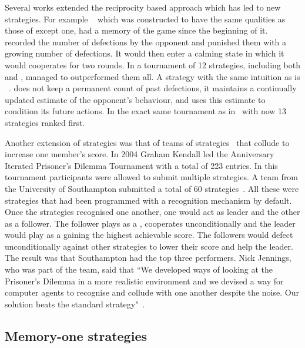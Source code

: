 Several works extended the reciprocity based approach which has led to new
strategies. For example \Gradual~\cite{Beaufils1997} which was constructed to
have the same qualities as those of \TitForTat except one,
\Gradual had a memory of the game since the beginning of it. \Gradual
recorded the number of defections by the opponent and punished them with a
growing number of defections. It would then enter a calming state in which it
would cooperates for two rounds. In a tournament of 12 strategies, including
both \TitForTat and \Pavlov, \Gradual managed to outperformed them all. A
strategy with the same intuition as \Gradual is \AdaptiveTitForTat~\cite{tzafestas-2000a}.
\AdaptiveTitForTat does not keep a permanent
count of past defections, it maintains a continually updated estimate of the
opponent’s behaviour, and uses this estimate to condition its future actions. In
the exact same tournament as in~\cite{Beaufils1997} with now 13 strategies
\AdaptiveTitForTat ranked first.

Another extension of strategies was that of teams of
strategies~\cite{J.P.Delahaye1993Lp, J.P.Delahaye1995LIeP, A.Rogers2007Ctpw}
that collude to increase one member's score. In 2004 Graham Kendall led the
Anniversary Iterated Prisoner's Dilemma Tournament with a total of 223 entries.
In this tournament participants were allowed to submit multiple strategies. A
team from the University of Southampton submitted a total of 60
strategies~\cite{A.Rogers2007Ctpw}. All these were strategies that had been
programmed with a recognition mechanism by default. Once the strategies
recognised one another, one would act as leader and the other as a follower. The
follower plays as a \Cooperator, cooperates unconditionally and the
leader would play as a \Defector gaining the highest achievable score.
The followers would defect unconditionally against other strategies to lower
their score and help the leader. The result was that Southampton had the top
three performers. Nick Jennings, who was part of the team, said that ``We
developed ways of looking at the Prisoner's Dilemma in a more realistic
environment and we devised a way for computer agents to recognise and collude
with one another despite the noise. Our solution beats the standard \TitForTat
strategy"~\cite{southampton_blog}.

\subsection{Memory-one strategies}\label{section:memory_one}

